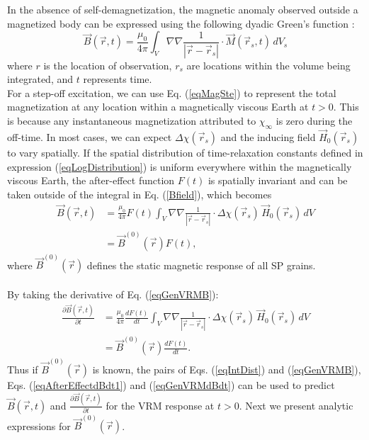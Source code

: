 \documentclass[journal]{IEEEtran}  %
\begin{document}
In the absence of self-demagnetization,  the magnetic anomaly
observed outside a magnetized body can be expressed using the
following dyadic Green's function \cite{Blakely1996}:
\begin{equation}
\vec B(\vec r,t) = \frac{\mu_0}{4 \pi} \int_{V} \nabla \nabla
\frac{1}{| \vec r - \vec r_s |} \cdot \vec M(\vec r_s, t) \, dV_s
\label{Bfield}
\end{equation}
where $r$ is the location of observation, $r_s$ are locations within the volume being integrated, and $t$ represents time.
\\

For a step-off excitation, we can use Eq.
(\ref{eqMagSte})  to represent the total magnetization at any
location within a magnetically viscous Earth at $t > 0$. This is
because any instantaneous magnetization attributed to $\chi_\infty$
is zero during the off-time. In most cases, we can expect $\Delta
\chi(\vec r_s)$ and the inducing field $\vec H_0(\vec r_s)$ to vary
spatially. If the spatial distribution of time-relaxation constants
defined in expression (\ref{eqLogDistribution}) is uniform
everywhere within the magnetically viscous Earth, the after-effect
function $F(t)$ is spatially invariant and can be taken outside of the
integral in Eq. (\ref{Bfield}), which becomes
\begin{align}
\vec B(\vec r,t) &= \frac{\mu_0}{4 \pi} F(t) \int_V \nabla \nabla \frac{1}{| \vec r - \vec r_s |} \cdot \Delta \chi(\vec r_s) \, \vec H_0(\vec r_s) \, dV \nonumber \\
&= \vec B^{(0)} (\vec r) F(t), \label{eqGenVRMB}
\end{align}
where $\vec B^{(0)}(\vec r)$ defines  the static
magnetic response of all SP grains.
\\\\
By taking the derivative of Eq. (\ref{eqGenVRMB}):
\begin{align}
\frac{\partial \vec B(\vec r,t)}{\partial t} &= \frac{\mu_0}{4 \pi} \frac{d F(t)}{dt} \int_V \nabla \nabla \frac{1}{| \vec r - \vec r_s |} \cdot \Delta \chi(\vec r_s) \, \vec H_0(\vec r_s) \, dV \nonumber \\
&= \vec B^{(0)} (\vec r) \frac{d F(t)}{dt}. \label{eqGenVRMdBdt}
\end{align}
Thus if $\vec B^{(0)}(\vec r)$ is known, the pairs of
Eqs. (\ref{eqIntDist}) and (\ref{eqGenVRMB}), Eqs.
(\ref{eqAfterEffectdBdt1}) and (\ref{eqGenVRMdBdt}) can be used to
predict $\vec B(\vec r,t)$ and $\frac{\partial \vec B(\vec
r,t)}{\partial t}$ for the VRM response at $t
> 0$. Next we present analytic expressions for $\vec B^{(0)} (\vec r)$.
\end{document}
